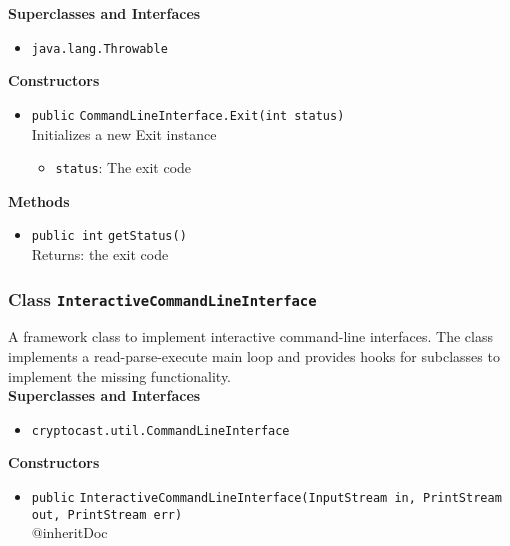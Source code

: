 \textbf{Superclasses and Interfaces}
\begin{itemize}
\item \lstinline|java.lang.Throwable|
\end{itemize}



\textbf{Constructors}
\begin{itemize}
\item \lstinline|public| \lstinline|CommandLineInterface.Exit|\lstinline|(int status)|\\
Initializes a new Exit instance
\begin{itemize}
\item \lstinline|status|: The exit code
\end{itemize}



\end{itemize}


\textbf{Methods}
\begin{itemize}
\item \lstinline|public int| \lstinline|getStatus|\lstinline|()|\\
Returns: the exit code



\end{itemize}

\subsubsection{Class \lstinline|InteractiveCommandLineInterface|}
A framework class to implement interactive command-line interfaces. The class implements
 a read-parse-execute main loop and provides hooks for subclasses to implement the missing
 functionality. \\


\textbf{Superclasses and Interfaces}
\begin{itemize}
\item \lstinline|cryptocast.util.CommandLineInterface|
\end{itemize}



\textbf{Constructors}
\begin{itemize}
\item \lstinline|public| \lstinline|InteractiveCommandLineInterface|\lstinline|(InputStream in, PrintStream out, PrintStream err)|\\
{@inheritDoc}



\end{itemize}


